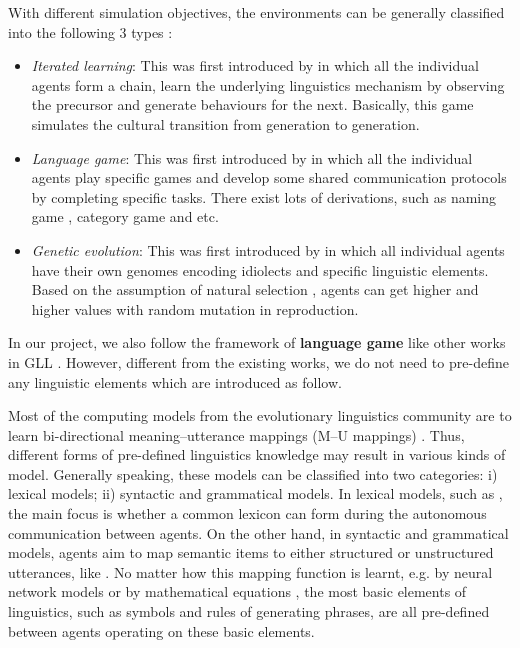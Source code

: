 \documentclass[a4paper,11pt]{article}
\begin{document}
With different simulation objectives, the environments can be generally classified into the following 3 types \cite{gong2013computer}:
\begin{itemize}
  \item \textit{Iterated learning}: This was first introduced by \cite{kirby1999function} in which all the individual agents form a chain, learn the underlying linguistics mechanism by observing the precursor and generate behaviours for the next. Basically, this game simulates the cultural transition from generation to generation.
  \item \textit{Language game}: This was first introduced by \cite{wittgenstein2009philosophical} in which all the individual agents play specific games and develop some shared communication protocols by completing specific tasks. There exist lots of derivations, such as naming game \cite{baronchelli2006sharp}, category game \cite{puglisi2008cultural} and etc.
  \item \textit{Genetic evolution}: This was first introduced by \cite{briscoe1998language} in which all individual agents have their own genomes encoding idiolects and specific linguistic elements. Based on the assumption of natural selection \cite{darwin1859origin}, agents can get higher and higher values with random mutation in reproduction.
\end{itemize}

In our project, we also follow the framework of \textbf{language game} like other works in GLL \cite{hermann2017grounded}. However, different from the existing works, we do not need to pre-define any linguistic elements which are introduced as follow.

Most of the computing models from the evolutionary linguistics community are to learn bi-directional meaning–utterance mappings (M–U mappings) \cite{gong2013computer}. Thus, different forms of pre-defined linguistics knowledge may result in various kinds of model. Generally speaking, these models can be classified into two categories: i) lexical models; ii) syntactic and grammatical models. In lexical models, such as \cite{steels2005emergence, baronchelli2006sharp, puglisi2008cultural}, the main focus is whether a common lexicon can form during the autonomous communication between agents. On the other hand, in syntactic and grammatical models, agents aim to map semantic items to either structured or unstructured utterances, like \cite{kirby1999function, vogt2005acquisition}. No matter how this mapping function is learnt, e.g. by neural network models \cite{munroe2002learning} or by mathematical equations \cite{minett2008modelling, ke2008language}, the most basic elements of linguistics, such as symbols and rules of generating phrases, are all pre-defined between agents operating on these basic elements.
\end{document}
